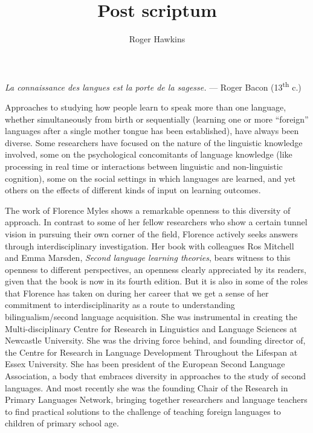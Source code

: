 \documentclass[output=paper]{langscibook}
\author{Roger Hawkins\orcid{}\affiliation{University of Essex}}
\title{Post scriptum}
\begin{document}
\AffiliationsWithoutIndexing{}
\maketitle

\begin{flushright}
\textit{La connaissance des langues est la porte de la sagesse.} --- Roger Bacon (13\textsuperscript{th} c.)
\end{flushright}

\noindent Approaches to studying how people learn to speak more than one language, whether simultaneously from birth or sequentially (learning one or more ``foreign'' languages after a single mother tongue has been established), have always been diverse. Some researchers have focused on the nature of the linguistic knowledge involved, some on the psychological concomitants of language knowledge (like processing in real time or interactions between linguistic and non-linguistic cognition), some on the social settings in which languages are learned, and yet others on the effects of different kinds of input on learning outcomes.

The work of Florence Myles shows a remarkable openness to this diversity of approach. In contrast to some of her fellow researchers who show a certain tunnel vision in pursuing their own corner of the field, Florence actively seeks answers through interdisciplinary investigation. Her book with colleagues Ros Mitchell and Emma Marsden, \textit{Second language learning theories}, bears witness to this openness to different perspectives, an openness clearly appreciated by its readers, given that the book is now in its fourth edition. But it is also in some of the roles that Florence has taken on during her career that we get a sense of her commitment to interdisciplinarity as a route to understanding bilingualism/second language acquisition. She was instrumental in creating the Multi-disciplinary Centre for Research in Linguistics and Language Sciences at Newcastle University. She was the driving force behind, and founding director of, the Centre for Research in Language Development Throughout the Lifespan at Essex University. She has been president of the European Second Language Association, a body that embraces diversity in approaches to the study of second languages. And most recently she was the founding Chair of the Research in Primary Languages Network, bringing together researchers and language teachers to find practical solutions to the challenge of teaching foreign languages to children of primary school age.
\end{document}
